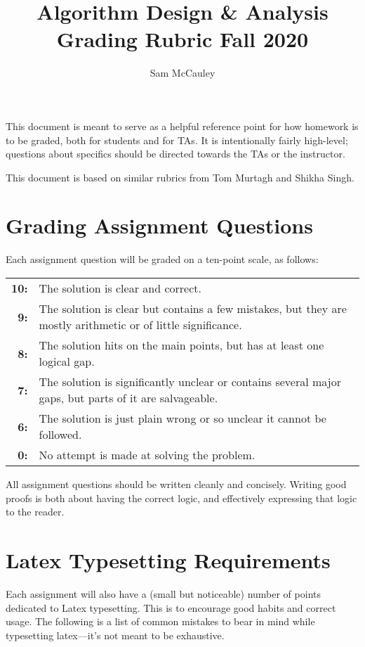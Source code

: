 \documentclass{article}
\title{Algorithm Design \& Analysis Grading Rubric Fall 2020}
\author{Sam McCauley}
\date{}
\begin{document}
\maketitle

This document is meant to serve as a helpful reference point for how homework is to be graded, both for students and for TAs.  It is intentionally fairly high-level; questions about specifics should be directed towards the TAs or the instructor.

This document is based on similar rubrics from Tom Murtagh and Shikha Singh.

\section*{Grading Assignment Questions}

Each assignment question will be graded on a ten-point scale, as follows:

\smallskip

\begin{tabular}{rl}
  \textbf{10:}& 	The solution is clear and correct.\\
\textbf{9:} &	The solution is clear but contains a few mistakes, but they are mostly arithmetic or of little significance.\\
\textbf{8:} &	The solution hits on the main points, but has at least one logical gap.\\
\textbf{7:} &	The solution is significantly unclear or contains several major gaps, but parts of it are salvageable.\\
\textbf{6:} &	The solution is just plain wrong or so unclear it cannot be followed.\\
\textbf{0:} &	No attempt is made at solving the problem.
\end{tabular}

\smallskip

All assignment questions should be written cleanly and concisely.  Writing good proofs is both about having the correct logic, and effectively expressing that logic to the reader.

\section*{Latex Typesetting Requirements}

Each assignment will also have a (small but noticeable) number of points dedicated to Latex typesetting.  This is to encourage good habits and correct usage.  The following is a list of common mistakes to bear in mind while typesetting latex---it's not meant to be exhaustive.
\end{document}
